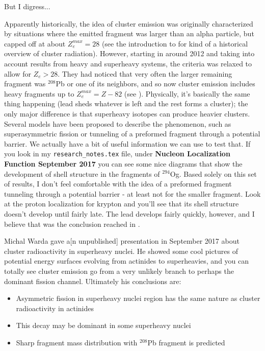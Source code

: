 But I digress...

Apparently historically, the idea of cluster emission was originally characterized by situations where the emitted fragment was larger than an alpha particle, but capped off at about $Z_e^{max}=28$ (see the introduction to \cite{Warda2011} for kind of a historical overview of cluster radiation). However, starting in around 2012 and taking into account results from heavy and superheavy systems, the criteria was relaxed to allow for $Z_e>28$. They had noticed that very often the larger remaining fragment was $^{208}$Pb or one of its neighbors, and so now cluster emission includes heavy fragments up to $Z_e^{max}=Z-82$ (see \cite{Poenaru2012}). Physically, it's basically the same thing happening (lead sheds whatever is left and the rest forms a cluster); the only major difference is that superheavy isotopes can produce heavier clusters. Several models have been proposed to describe the phenomenon, such as superasymmetric fission or tunneling of a preformed fragment through a potential barrier. We actually have a bit of useful information we can use to test that. If you look in my \texttt{research\_notes.tex} file, under \textbf{Nucleon Localization Function  September 2017} you can see some nice diagrams that show the development of shell structure in the fragments of $^{294}$Og. Based solely on this set of results, I don't feel comfortable with the idea of a preformed fragment tunneling through a potential barrier - at least not for the smaller fragment. Look at the proton localization for krypton and you'll see that its shell structure doesn't develop until fairly late. The lead develops fairly quickly, however, and I believe that was the conclusion reached in \cite{Warda2011}.

Michal Warda gave a[n unpublished] presentation in September 2017 about cluster radioactivity in superheavy nuclei. He showed some cool pictures of potential energy surfaces evolving from actinides to superheavies, and you can totally see cluster emission go from a very unlikely branch to perhaps the dominant fission channel. Ultimately his conclusions are:

\begin{itemize}
\item Asymmetric fission in superheavy nuclei region has the same nature as cluster radioactivity in actinides
\item This decay may be dominant in some superheavy nuclei
\item Sharp fragment mass distribution with $^{208}$Pb fragment is predicted
\end{itemize}

